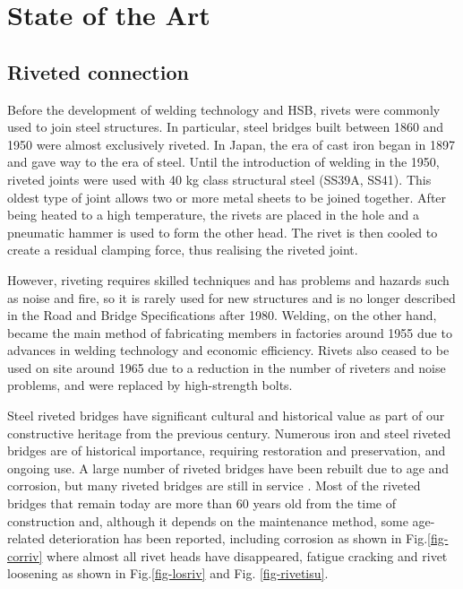 \chapter{State of the Art}
\label{ch2}

\begin{spacing}{1.25} %
\minitoc %
\end{spacing} %
\onehalfspacing %

\section{Riveted connection}

Before the development of welding technology and \ac{HSB}, rivets were commonly used to join steel structures. In particular, steel bridges built between 1860 and 1950 were almost exclusively riveted. In Japan, the era of cast iron began in 1897 and gave way to the era of steel. Until the introduction of welding in the 1950, riveted joints were used with 40 kg class structural steel (SS39A, SS41)\cite{rivet1934}. This oldest type of joint allows two or more metal sheets to be joined together. After being heated to a high temperature, the rivets are placed in the hole and a pneumatic hammer is used to form the other head. The rivet is then cooled to create a residual clamping force, thus realising the riveted joint.

However, riveting requires skilled techniques and has problems and hazards such as noise and fire, so it is rarely used for new structures and is no longer described in the Road and Bridge Specifications after 1980. Welding, on the other hand, became the main method of fabricating members in factories around 1955 due to advances in welding technology and economic efficiency. Rivets also ceased to be used on site around 1965 due to a reduction in the number of riveters and noise problems, and were replaced by high-strength bolts.

Steel riveted bridges have significant cultural and historical value as part of our constructive heritage from the previous century. Numerous iron and steel riveted bridges are of historical importance, requiring restoration and preservation, and ongoing use. A large number of riveted bridges have been rebuilt due to age and corrosion, but many riveted bridges are still in service \cite{COLLETTE2014}. Most of the riveted bridges that remain today are more than 60 years old from the time of construction and, although it depends on the maintenance method, some age-related deterioration has been reported, including corrosion as shown in Fig.\ref{fig-corriv} where almost all rivet heads have disappeared, fatigue cracking and rivet loosening as shown in Fig.\ref{fig-losriv} and Fig. \ref{fig-rivetisu}.

